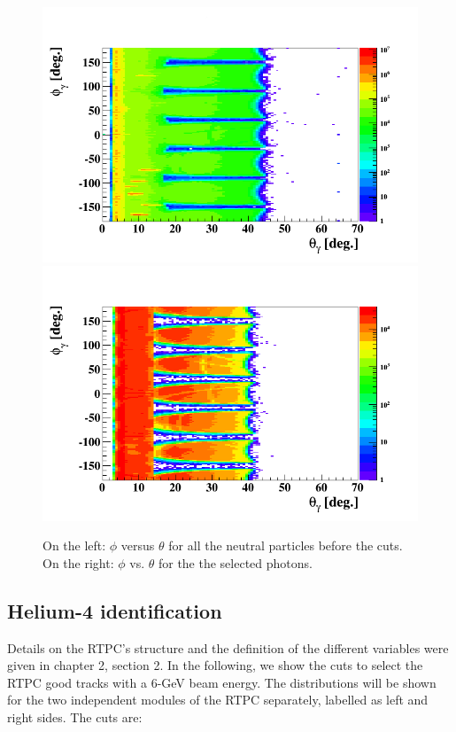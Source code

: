 \begin{figure}[tbp]
\hspace{-0.2in}
\includegraphics[scale=0.35]{fig_analysis/photon_phi_theta_1.png}
\includegraphics[scale=0.35]{fig_analysis/photon_phi_theta_2.png}
\caption{On the left: $\phi$ versus $\theta$ for all the neutral particles before the cuts. On the right: $\phi$ vs. $\theta$ for the the selected photons.} 
\label{fig:photon_phi_theta}
\end{figure}

\subsection{Helium-4 identification}
Details on the RTPC's structure and the definition of the different 
variables were given in chapter 2, section 2. In the following, we show the 
cuts to select the RTPC good tracks with a 6-GeV beam energy. The distributions 
will be shown for the two independent modules of the RTPC separately, labelled 
as left and right sides. The cuts are:

